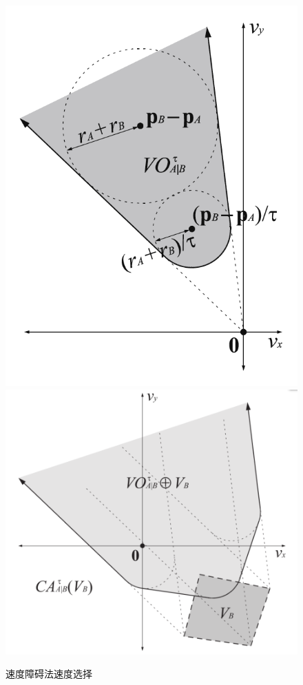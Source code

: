 \documentclass{seuthesis-2022}
\begin{document}
\begin{figure}[H]
    \centering
      {\includegraphics{fig/速度障碍集合.png}}
      {\includegraphics{fig/避免碰撞集合.png}}
    \caption{速度障碍法速度选择}
    \label{fig:2}
\end{figure}
\end{document}
